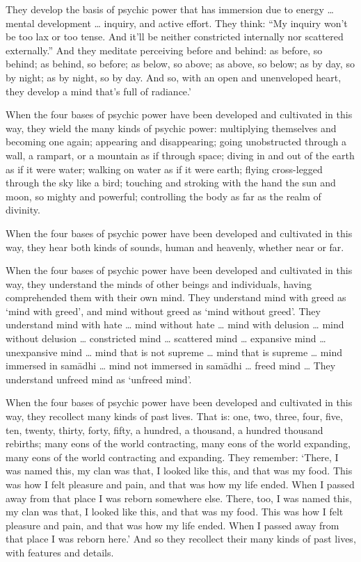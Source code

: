\documentclass[12pt,openany]{book}%
\begin{document}
They develop the basis of psychic power that has immersion due to energy … mental development … inquiry, and active effort. They think: “My inquiry won’t be too lax or too tense. And it’ll be neither constricted internally nor scattered externally.” And they meditate perceiving before and behind: as before, so behind; as behind, so before; as below, so above; as above, so below; as by day, so by night; as by night, so by day. And so, with an open and unenveloped heart, they develop a mind that’s full of radiance.’ 

When the four bases of psychic power have been developed and cultivated in this way, they wield the many kinds of psychic power: multiplying themselves and becoming one again; appearing and disappearing; going unobstructed through a wall, a rampart, or a mountain as if through space; diving in and out of the earth as if it were water; walking on water as if it were earth; flying cross-legged through the sky like a bird; touching and stroking with the hand the sun and moon, so mighty and powerful; controlling the body as far as the realm of divinity. 

When the four bases of psychic power have been developed and cultivated in this way, they hear both kinds of sounds, human and heavenly, whether near or far. 

When the four bases of psychic power have been developed and cultivated in this way, they understand the minds of other beings and individuals, having comprehended them with their own mind. They understand mind with greed as ‘mind with greed’, and mind without greed as ‘mind without greed’. They understand mind with hate … mind without hate … mind with delusion … mind without delusion … constricted mind … scattered mind … expansive mind … unexpansive mind … mind that is not supreme … mind that is supreme … mind immersed in \textsanskrit{samādhi} … mind not immersed in \textsanskrit{samādhi} … freed mind … They understand unfreed mind as ‘unfreed mind’. 

When the four bases of psychic power have been developed and cultivated in this way, they recollect many kinds of past lives. That is: one, two, three, four, five, ten, twenty, thirty, forty, fifty, a hundred, a thousand, a hundred thousand rebirths; many eons of the world contracting, many eons of the world expanding, many eons of the world contracting and expanding. They remember: ‘There, I was named this, my clan was that, I looked like this, and that was my food. This was how I felt pleasure and pain, and that was how my life ended. When I passed away from that place I was reborn somewhere else. There, too, I was named this, my clan was that, I looked like this, and that was my food. This was how I felt pleasure and pain, and that was how my life ended. When I passed away from that place I was reborn here.’ And so they recollect their many kinds of past lives, with features and details. 
\end{document}
